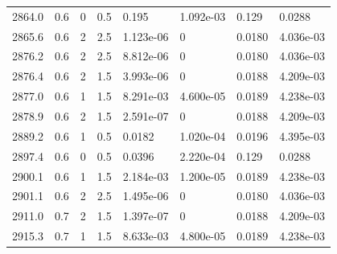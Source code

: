 \documentclass[preview]{standalone}
\begin{document}
{{{{{{{{{{\begin{tabular}{L{1.2cm}C{1.2cm} C{0.3cm}C{0.5cm} C{1.4cm}C{1.4cm} C{1.4cm}C{1.4cm}}
  2864.0  &   0.6  & 0     & 0.5 &  0.195  & 1.092e-03  & 0.129 &  0.0288   \\ 
  2865.6  &   0.6  & 2     & 2.5 &  1.123e-06  & 0  & 0.0180 &  4.036e-03   \\ 
  2876.2  &   0.6  & 2     & 2.5 &  8.812e-06  & 0  & 0.0180 &  4.036e-03   \\ 
  2876.4  &   0.6  & 2     & 1.5 &  3.993e-06  & 0  & 0.0188 &  4.209e-03   \\ 
  2877.0  &   0.6  & 1     & 1.5 &  8.291e-03  & 4.600e-05  & 0.0189 &  4.238e-03   \\ 
  2878.9  &   0.6  & 2     & 1.5 &  2.591e-07  & 0  & 0.0188 &  4.209e-03   \\ 
  2889.2  &   0.6  & 1     & 0.5 &  0.0182  & 1.020e-04  & 0.0196 &  4.395e-03   \\ 
  2897.4  &   0.6  & 0     & 0.5 &  0.0396  & 2.220e-04  & 0.129 &  0.0288   \\ 
  2900.1  &   0.6  & 1     & 1.5 &  2.184e-03  & 1.200e-05  & 0.0189 &  4.238e-03   \\ 
  2901.1  &   0.6  & 2     & 2.5 &  1.495e-06  & 0  & 0.0180 &  4.036e-03   \\ 
  2911.0  &   0.7  & 2     & 1.5 &  1.397e-07  & 0  & 0.0188 &  4.209e-03   \\ 
  2915.3  &   0.7  & 1     & 1.5 &  8.633e-03  & 4.800e-05  & 0.0189 &  4.238e-03   \\ 
\hline 
\end{tabular} 

}}}}}}}}}}
\end{document}
